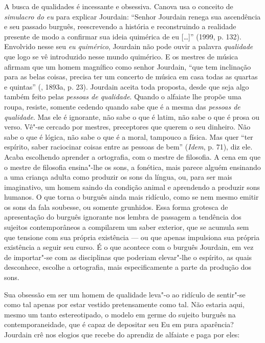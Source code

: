 A busca de qualidades é incessante e obsessiva. Canova usa o conceito de
\emph{simulacro do eu} para explicar Jourdain: ``Senhor Jourdain renega
sua ascendência e seu passado burguês, reescrevendo a história e
reconstruindo a realidade presente de modo a confirmar sua ideia
quimérica de eu [\ldots{}]'' (1999, p. 132). Envolvido nesse seu
\emph{eu quimérico}, Jourdain não pode ouvir a palavra \emph{qualidade}
que logo se vê introduzido nesse mundo quimérico. E os mestres de música
afirmam que um homem magnífico como senhor Jourdain, ``que tem
inclinação para as belas coisas, precisa ter um concerto de música em
casa todas as quartas e quintas'' (, 1893a, p. 23). Jourdain aceita
toda proposta, desde que seja algo também feito pelas \emph{pessoas de
qualidade}. Quando o alfaiate lhe propõe uma roupa, resiste, somente
cedendo quando sabe que é a mesma das \emph{pessoas de qualidade}. Mas
ele é ignorante, não sabe o que é latim, não sabe o que é prosa ou
verso. Vê"-se cercado por mestres, preceptores que querem o seu dinheiro.
Não sabe o que é lógica, não sabe o que é a moral, tampouco a física.
Mas quer ``ter espírito, saber raciocinar coisas entre as pessoas de
bem'' (\emph{Idem}, p. 71), diz ele. Acaba escolhendo aprender a
ortografia, com o mestre de filosofia. A cena em que o mestre de
filosofia ensina"-lhe os sons, a fonética, mais parece alguém ensinando a
uma criança adulta como produzir os sons da língua, ou, para ser mais
imaginativo, um homem saindo da condição animal e aprendendo a produzir
sons humanos. O que torna o burguês ainda mais ridículo, como se nem
mesmo emitir os sons da fala soubesse, ou somente grunhidos. Essa forma
grotesca de apresentação do burguês ignorante nos lembra de passagem a
tendência dos sujeitos contemporâneos a compilarem um saber exterior,
que se acumula sem que tensione com sua própria existência --- ou que
apenas impulsiona sua própria existência a seguir seu curso. É o que
acontece com o burguês Jourdain, em vez de importar"-se com as
disciplinas que poderiam elevar"-lhe o espírito, as quais desconhece,
escolhe a ortografia, mais especificamente a parte da produção dos sons.

Sua obsessão em ser um homem de qualidade leva"-o ao ridículo de
sentir"-se como tal apenas por estar vestido pretensamente como tal. Não
estaria aqui, mesmo um tanto estereotipado, o modelo em germe do sujeito
burguês na contemporaneidade, que é capaz de depositar seu Eu em pura
aparência? Jourdain crê nos elogios que recebe do aprendiz de alfaiate e
paga por eles:

